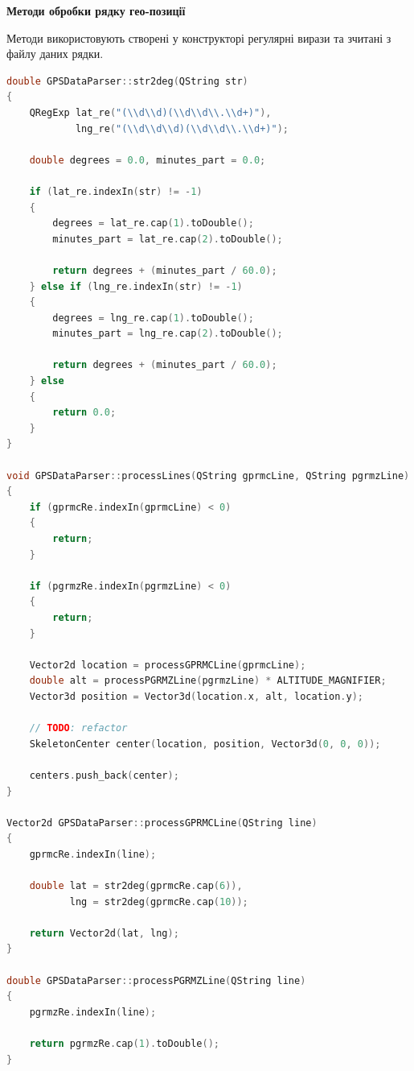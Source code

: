 \documentclass[simple,a4paper,14pt,ukrainian,utf8]{eskdtext}
\begin{document}
		\textbf{Методи обробки рядку гео-позиції}
		
		Методи використовують створені у конструкторі регулярні вирази та зчитані з файлу даних рядки.
		
\begin{small}
\begin{lstlisting}[language=C++]
double GPSDataParser::str2deg(QString str)
{
    QRegExp lat_re("(\\d\\d)(\\d\\d\\.\\d+)"),
            lng_re("(\\d\\d\\d)(\\d\\d\\.\\d+)");

    double degrees = 0.0, minutes_part = 0.0;

    if (lat_re.indexIn(str) != -1)
    {
        degrees = lat_re.cap(1).toDouble();
        minutes_part = lat_re.cap(2).toDouble();

        return degrees + (minutes_part / 60.0);
    } else if (lng_re.indexIn(str) != -1)
    {
        degrees = lng_re.cap(1).toDouble();
        minutes_part = lng_re.cap(2).toDouble();

        return degrees + (minutes_part / 60.0);
    } else
    {
        return 0.0;
    }
}

void GPSDataParser::processLines(QString gprmcLine, QString pgrmzLine)
{
    if (gprmcRe.indexIn(gprmcLine) < 0)
    {
        return;
    }

    if (pgrmzRe.indexIn(pgrmzLine) < 0)
    {
        return;
    }

    Vector2d location = processGPRMCLine(gprmcLine);
    double alt = processPGRMZLine(pgrmzLine) * ALTITUDE_MAGNIFIER;
    Vector3d position = Vector3d(location.x, alt, location.y);

    // TODO: refactor
    SkeletonCenter center(location, position, Vector3d(0, 0, 0));

    centers.push_back(center);
}

Vector2d GPSDataParser::processGPRMCLine(QString line)
{
    gprmcRe.indexIn(line);

    double lat = str2deg(gprmcRe.cap(6)),
           lng = str2deg(gprmcRe.cap(10));

    return Vector2d(lat, lng);
}

double GPSDataParser::processPGRMZLine(QString line)
{
    pgrmzRe.indexIn(line);

    return pgrmzRe.cap(1).toDouble();
}
\end{lstlisting}
\end{small}
\end{document}
